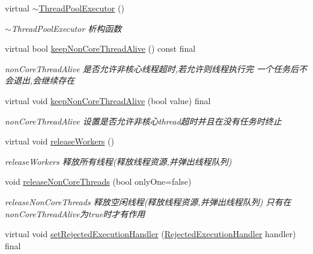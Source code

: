 \begin{DoxyCompactItemize}
\mbox{\label{classThreadPoolExecutor_a1d5a1c3330593f243959256d32068c15}} 
virtual \hyperlink{classThreadPoolExecutor_a1d5a1c3330593f243959256d32068c15}{$\sim$\+Thread\+Pool\+Executor} ()
\begin{DoxyCompactList}\small\item\em $\sim$\+Thread\+Pool\+Executor 析构函数 \end{DoxyCompactList}\item 
virtual bool \hyperlink{classThreadPoolExecutor_ac2aa11f7cde6e6082eb0dde8f2385dce}{keep\+Non\+Core\+Thread\+Alive} () const final
\begin{DoxyCompactList}\small\item\em non\+Core\+Thread\+Alive 是否允许非核心线程超时,若允许则线程执行完 一个任务后不会退出,会继续存在 \end{DoxyCompactList}\item 
virtual void \hyperlink{classThreadPoolExecutor_a7e6ed2d088147377d1e82018ac3dac1d}{keep\+Non\+Core\+Thread\+Alive} (bool value) final
\begin{DoxyCompactList}\small\item\em non\+Core\+Thread\+Alive 设置是否允许非核心thread超时并且在没有任务时终止 \end{DoxyCompactList}\item 
\mbox{\label{classThreadPoolExecutor_a7d4bfa422c41a11fcdd33e7a1b2bcec8}} 
virtual void \hyperlink{classThreadPoolExecutor_a7d4bfa422c41a11fcdd33e7a1b2bcec8}{release\+Workers} ()
\begin{DoxyCompactList}\small\item\em release\+Workers 释放所有线程(释放线程资源,并弹出线程队列) \end{DoxyCompactList}\item 
void \hyperlink{classThreadPoolExecutor_a5d2d340118dd847534533f8bf2e9ae94}{release\+Non\+Core\+Threads} (bool only\+One=false)
\begin{DoxyCompactList}\small\item\em release\+Non\+Core\+Threads 释放空闲线程(释放线程资源,并弹出线程队列) 只有在non\+Core\+Thread\+Alive为true时才有作用 \end{DoxyCompactList}\item 
virtual void \hyperlink{classThreadPoolExecutor_a0a471dc0a68b70d99d8215565a4df688}{set\+Rejected\+Execution\+Handler} (\hyperlink{classRejectedExecutionHandler}{Rejected\+Execution\+Handler} handler) final

\end{DoxyCompactItemize}
